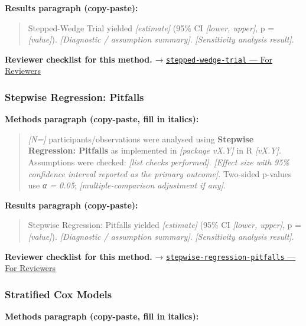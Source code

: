 \documentclass[
]{article}
\begin{document}
\textbf{Results paragraph (copy-paste):}

\begin{quote}
Stepped-Wedge Trial yielded \emph{{[}estimate{]}} (95\% CI
\emph{{[}lower, upper{]}}, p = \emph{{[}value{]}}). \emph{{[}Diagnostic
/ assumption summary{]}}. \emph{{[}Sensitivity analysis result{]}}.
\end{quote}

\textbf{Reviewer checklist for this method.} →
\href{../chapters/14-clinical/stepped-wedge-trial.Rmd\#for-reviewers}{\texttt{stepped-wedge-trial}
--- For Reviewers}

\subsubsection{Stepwise Regression:
Pitfalls}\label{stepwise-regression-pitfalls}

\textbf{Methods paragraph (copy-paste, fill in italics):}

\begin{quote}
\emph{{[}N={]}} participants/observations were analysed using
\textbf{Stepwise Regression: Pitfalls} as implemented in
\emph{{[}package vX.Y{]}} in R \emph{{[}vX.Y{]}}. Assumptions were
checked: \emph{{[}list checks performed{]}}. \emph{{[}Effect size with
95\% confidence interval reported as the primary outcome{]}}. Two-sided
p-values use \emph{α = 0.05}; \emph{{[}multiple-comparison adjustment if
any{]}}.
\end{quote}

\textbf{Results paragraph (copy-paste):}

\begin{quote}
Stepwise Regression: Pitfalls yielded \emph{{[}estimate{]}} (95\% CI
\emph{{[}lower, upper{]}}, p = \emph{{[}value{]}}). \emph{{[}Diagnostic
/ assumption summary{]}}. \emph{{[}Sensitivity analysis result{]}}.
\end{quote}

\textbf{Reviewer checklist for this method.} →
\href{../chapters/07-regression/stepwise-regression-pitfalls.Rmd\#for-reviewers}{\texttt{stepwise-regression-pitfalls}
--- For Reviewers}

\subsubsection{Stratified Cox Models}\label{stratified-cox-models}

\textbf{Methods paragraph (copy-paste, fill in italics):}
\end{document}
